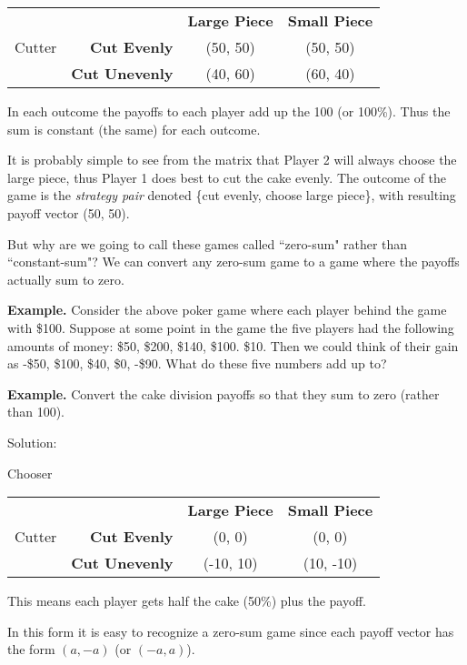 \begin{tabular}{l|r|c|c|}\cline{2-4}
&&\textbf{Large Piece}&\textbf{Small Piece}\\ \cline{2-4}
Cutter&\textbf{Cut Evenly} &(50, 50)&(50, 50)\\ \cline{2-4}
&\textbf{Cut Unevenly} &(40, 60)&(60, 40)\\ \cline{2-4}

\end{tabular}
\medskip
In each outcome the payoffs to each player add up the 100 (or 100\%). Thus the sum is constant (the same) for each outcome. 

It is probably simple to see from the matrix that Player 2 will always choose the large piece, thus Player 1 does best to cut the cake evenly. The outcome of the game is the {\it strategy pair} denoted \{cut evenly, choose large piece\}, with resulting payoff vector (50, 50).


But why are we going to call these games called ``zero-sum" rather than ``constant-sum"?  We can convert any zero-sum game to a game where the payoffs actually sum to zero.

{\bf Example.} Consider the above poker game where each player behind the game with \$100. Suppose at some point in the game  the five players had the following amounts of money: \$50, \$200, \$140, \$100. \$10. Then we could think of their gain as -\$50, \$100, \$40, \$0, -\$90. What do these five numbers add up to?

{\bf Example.} Convert the cake division payoffs so that they sum to zero (rather than 100). 

Solution:

\hspace{1.2in}Chooser

\begin{tabular}{l|r|c|c|}\cline{2-4}
&&\textbf{Large Piece}&\textbf{Small Piece}\\ \cline{2-4}
Cutter&\textbf{Cut Evenly} &(0, 0)&(0, 0)\\ \cline{2-4}
&\textbf{Cut Unevenly} &(-10, 10)&(10, -10)\\ \cline{2-4}

\end{tabular}

\medskip
This means each player gets half the cake (50\%) plus the payoff.

\bigskip

In this form it is easy to recognize a zero-sum game since each payoff vector has the form $(a, -a)$ (or $(-a, a)$).

 